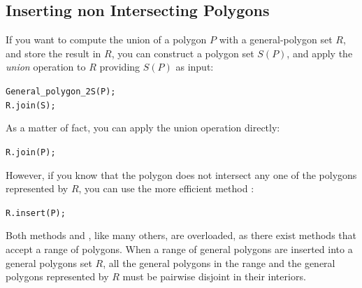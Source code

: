 
\subsection{Inserting non Intersecting Polygons}
\label{bso_ssec:insert}
If you want to compute the union of a polygon $P$ with a
general-polygon set $R$, and store the result in $R$, you can construct
a polygon set $S(P)$, and apply the {\em union} operation to
$R$ providing $S(P)$ as input:

\begin{alltt}
General_polygon_2 S(P);
R.join(S);
\end{alltt}

As a matter of fact, you can apply the union operation directly:

\begin{alltt}
R.join(P);
\end{alltt}

However, if you know that the polygon does not intersect any one of the
polygons represented by $R$, you can use the more efficient method
:

\begin{alltt}
R.insert(P);
\end{alltt}

Both methods  and , like many others, are 
overloaded, as there exist methods that accept a range of polygons. 
When a range of general polygons are inserted into a general polygons
set $R$, all the general polygons in the range and the general polygons 
represented by $R$ must be pairwise disjoint in their interiors.

